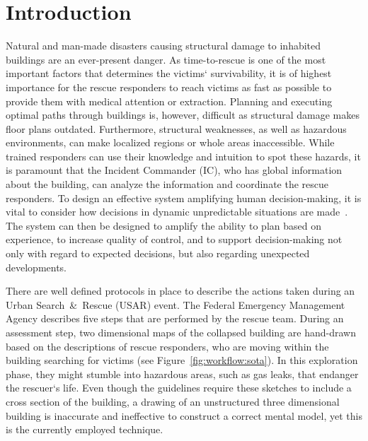 \section{Introduction}
Natural and man-made disasters causing structural damage to inhabited buildings are an ever-present danger. As time-to-rescue is one of the most important factors that determines the victims` survivability, it is of highest importance for the rescue responders to reach victims as fast as possible to provide them with medical attention or extraction. Planning and executing optimal paths through buildings is, however, difficult as structural damage makes floor plans outdated. Furthermore, structural weaknesses, as well as hazardous environments, can make localized regions or whole areas inaccessible. While trained responders can use their knowledge and intuition to spot these hazards, it is paramount that the Incident Commander (IC), who has global information about the building, can analyze the information and coordinate the rescue responders. To design an effective system amplifying human decision-making, it is vital to consider how decisions in dynamic unpredictable situations are made~\cite{Lundberg2012}. The system can then be designed to amplify the ability to plan based on experience, to increase quality of control, and to support decision-making not only with regard to expected decisions, but also regarding unexpected developments.

There are well defined protocols in place to describe the actions taken during an Urban Search~\&~Rescue (USAR) event. The Federal Emergency Management Agency describes five steps that are performed by the rescue team. During an assessment step, two dimensional maps of the collapsed building are hand-drawn based on the descriptions of rescue responders, who are moving within the building searching for victims (see Figure~\ref{fig:workflow:sota}). In this exploration phase, they might stumble into hazardous areas, such as gas leaks, that endanger the rescuer`s life. Even though the guidelines require these sketches to include a cross section of the building, a drawing of an unstructured three dimensional building is inaccurate and ineffective to construct a correct mental model, yet this is the currently employed technique.

